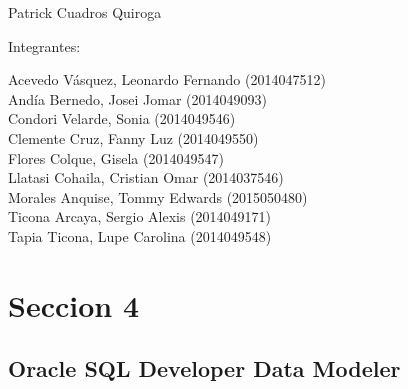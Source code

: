 \documentclass[12pt,letterpaper]{article}
\begin{document}
\begin{titlepage}
\begin{center}
\vspace*{0.1in}
\begin{large}
 Patrick Cuadros Quiroga\\
\end{large}

\vspace*{0.2in}
\vspace*{0.1in}
\begin{large}
Integrantes: \\
\begin{flushleft}
Acevedo Vásquez, Leonardo Fernando	\hfill	(2014047512) \\
Andía Bernedo, Josei Jomar 		\hfill	(2014049093) \\
Condori Velarde, Sonia          	\hfill	(2014049546) \\
Clemente Cruz, Fanny Luz    		\hfill	(2014049550) \\
Flores Colque, Gisela           	\hfill	(2014049547) \\
Llatasi Cohaila, Cristian Omar		\hfill	(2014037546) \\
Morales Anquise, Tommy Edwards 		\hfill	(2015050480) \\
Ticona Arcaya, Sergio Alexis		\hfill	(2014049171) \\
Tapia Ticona, Lupe Carolina		\hfill	(2014049548) \\
\end{flushleft}
\end{large}
\end{center}

\end{titlepage}




 \tableofcontents %
 \thispagestyle{empty} %
 \newpage
 \setcounter{page}{1} %



\section{Seccion 4} 
\subsection{Oracle SQL Developer Data Modeler}
\end{document}
